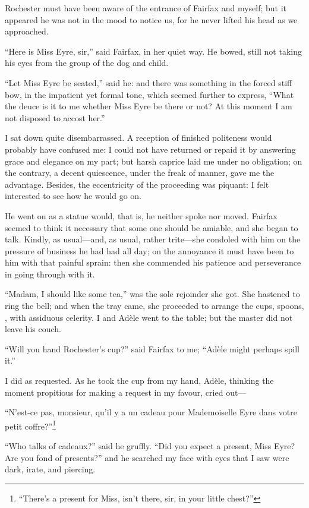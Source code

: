 \Mr{} Rochester must have been aware of the entrance of \Mrs{} Fairfax and
myself; but it appeared he was not in the mood to notice us, for he
never lifted his head as we approached.

\enquote{Here is Miss Eyre, sir,} said \Mrs{} Fairfax, in her quiet way.
He bowed, still not taking his eyes from the group of the dog and child.

\enquote{Let Miss Eyre be seated,} said he: and there was something in
the forced stiff bow, in the impatient yet formal tone, which seemed
further to express, \enquote{What the deuce is it to me whether Miss
	Eyre be there or not? At this moment I am not disposed to accost her.}

I sat down quite disembarrassed. A reception of finished politeness
would probably have confused me: I could not have returned or repaid it
by answering grace and elegance on my part; but harsh caprice laid me
under no obligation; on the contrary, a decent quiescence, under the
freak of manner, gave me the advantage. Besides, the eccentricity of
the proceeding was piquant: I felt interested to see how he would go on.

He went on as a statue would, that is, he neither spoke nor moved. \Mrs{}
Fairfax seemed to think it necessary that some one should be amiable,
and she began to talk. Kindly, as usual---and, as usual, rather
trite---she condoled with him on the pressure of business he had had all
day; on the annoyance it must have been to him with that painful sprain:
then she commended his patience and perseverance in going through with
it.

\enquote{Madam, I should like some tea,} was the sole rejoinder she
got. She hastened to ring the bell; and when the tray came, she
proceeded to arrange the cups, spoons, \etc, with assiduous celerity. I
and Adèle went to the table; but the master did not leave his couch.

\enquote{Will you hand \Mr{} Rochester's cup?} said \Mrs{} Fairfax to me;
\enquote{Adèle might perhaps spill it.}

I did as requested. As he took the cup from my hand, Adèle, thinking
the moment propitious for making a request in my favour, cried out---

\foreignquote{french}{N'est-ce pas, monsieur, qu'il y a un cadeau pour Mademoiselle
	Eyre dans votre petit coffre?}\footnote{\enquote{There's a present for Miss, isn't there, sir, in your little chest?}}

\enquote{Who talks of \foreignlanguage{french}{cadeaux}?} said he gruffly. \enquote{Did you
	expect a present, Miss Eyre? Are you fond of presents?} and he searched
my face with eyes that I saw were dark, irate, and piercing.


